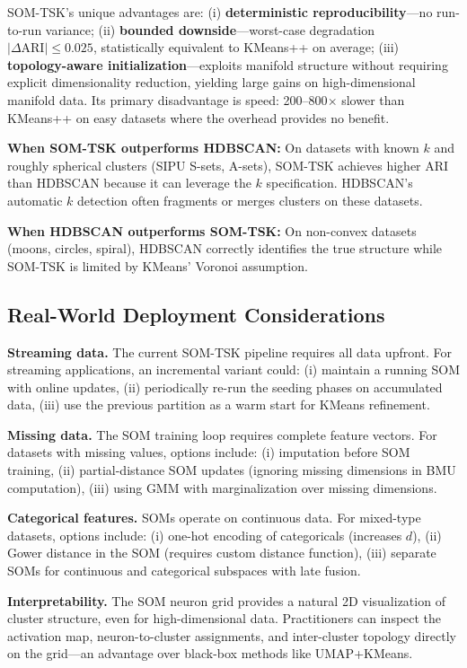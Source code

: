 \documentclass[journal]{IEEEtran}
\begin{document}
SOM-TSK's unique advantages are: (i) \textbf{deterministic reproducibility}---no run-to-run variance; (ii) \textbf{bounded downside}---worst-case degradation $|\Delta\text{ARI}| \le 0.025$, statistically equivalent to KMeans++ on average; (iii) \textbf{topology-aware initialization}---exploits manifold structure without requiring explicit dimensionality reduction, yielding large gains on high-dimensional manifold data. Its primary disadvantage is speed: 200--800$\times$ slower than KMeans++ on easy datasets where the overhead provides no benefit.

\textbf{When SOM-TSK outperforms HDBSCAN:} On datasets with known $k$ and roughly spherical clusters (SIPU S-sets, A-sets), SOM-TSK achieves higher ARI than HDBSCAN because it can leverage the $k$ specification. HDBSCAN's automatic $k$ detection often fragments or merges clusters on these datasets.

\textbf{When HDBSCAN outperforms SOM-TSK:} On non-convex datasets (moons, circles, spiral), HDBSCAN correctly identifies the true structure while SOM-TSK is limited by KMeans' Voronoi assumption.

\subsection{Real-World Deployment Considerations}
\label{sec:deployment}

\textbf{Streaming data.} The current SOM-TSK pipeline requires all data upfront. For streaming applications, an incremental variant could: (i) maintain a running SOM with online updates, (ii) periodically re-run the seeding phases on accumulated data, (iii) use the previous partition as a warm start for KMeans refinement.

\textbf{Missing data.} The SOM training loop requires complete feature vectors. For datasets with missing values, options include: (i) imputation before SOM training, (ii) partial-distance SOM updates (ignoring missing dimensions in BMU computation), (iii) using GMM with marginalization over missing dimensions.

\textbf{Categorical features.} SOMs operate on continuous data. For mixed-type datasets, options include: (i) one-hot encoding of categoricals (increases $d$), (ii) Gower distance in the SOM (requires custom distance function), (iii) separate SOMs for continuous and categorical subspaces with late fusion.

\textbf{Interpretability.} The SOM neuron grid provides a natural 2D visualization of cluster structure, even for high-dimensional data. Practitioners can inspect the activation map, neuron-to-cluster assignments, and inter-cluster topology directly on the grid---an advantage over black-box methods like UMAP+KMeans.
\end{document}

